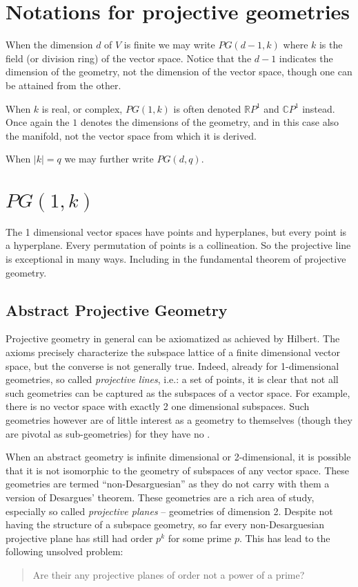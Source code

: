 \documentclass[12pt]{article}
\begin{document}
\section{Notations for projective geometries}

When the dimension $d$ of $V$ is finite we may write $PG(d-1,k)$ where $k$ is the field (or division ring) of the vector space.  Notice that the $d-1$ indicates the dimension of the geometry, not the dimension of the vector space, though one can be attained from the other.

When $k$ is real, or complex, $PG(1,k)$ is often denoted $\mathbb{R}P^1$ and $\mathbb{C}P^1$ instead.  Once again the $1$ denotes the dimensions of the geometry, and in this case also the manifold, not the vector space from which it is derived.

When $|k|=q$ we may further write $PG(d,q)$.

\section{$PG(1,k)$}

The 1 dimensional vector spaces have points and hyperplanes, but every point is a hyperplane.  Every permutation of points is a collineation.  So the projective line is exceptional in many ways.  Including in the fundamental theorem of projective geometry.


\subsection{Abstract Projective Geometry}

Projective geometry in general can be axiomatized as achieved by Hilbert.
The axioms precisely characterize the subspace lattice of a finite dimensional
vector space, but the converse is not generally true.  Indeed, already for 1-dimensional geometries, so called \emph{projective lines}, i.e.: a set of points, it is clear that not all such geometries can be captured as the subspaces of a vector space.  For example, there is no vector space with exactly 2  one dimensional subspaces. Such geometries however are of little interest as a geometry to themselves (though they are pivotal as sub-geometries) for they have no .

When an abstract geometry is infinite dimensional or 2-dimensional, it is possible that it is not isomorphic to the geometry of subspaces of any vector space.   These geometries are termed ``non-Desarguesian'' as they do not carry with them a version of Desargues' theorem.  These geometries are a rich area of study, especially so called \emph{projective planes} -- geometries of dimension 2.  Despite not having the structure of a subspace geometry, so far every non-Desarguesian projective plane has still had order $p^k$ for some prime $p$.
This has lead to the following unsolved problem:
\begin{quote}
Are their any projective planes of order not a power of a prime?
\end{quote}
\end{document}
